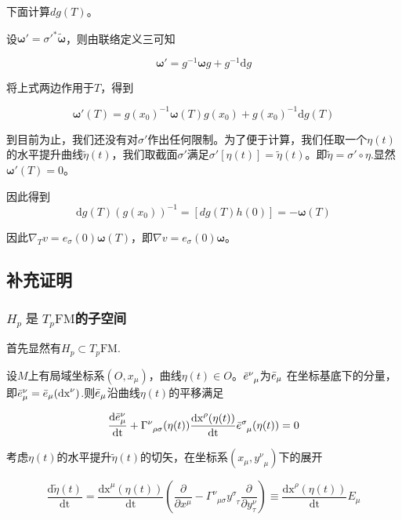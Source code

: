 \documentclass{ctexbook}
\begin{document}
下面计算$dg(T)$。

设$\bm{\omega}'=\sigma'^{*}\tilde{\bm{\omega}}$，则由联络定义三可知

\begin{equation}
    \bm{\omega}'=g^{-1}\bm{\omega}g+g^{-1}\mathrm{d}g
\end{equation}

将上式两边作用于$T$，得到

\begin{equation}
    \bm{\omega}'(T)=g(x_0)^{-1}\bm{\omega}(T)g(x_0)+g(x_0)^{-1}\mathrm{d}g(T)
\end{equation}

到目前为止，我们还没有对$\sigma'$作出任何限制。为了便于计算，我们任取一个$\eta(t)$的水平提升曲线$\tilde{\eta}(t)$，我们取截面$\sigma'$满足$\sigma'[\eta(t)]=\tilde{\eta}(t)$。即$\tilde{\eta}=\sigma'\circ\eta$.显然$\bm{\omega}'(T)=0$。

因此得到
\begin{equation}
    \mathrm{d}g(T)(g(x_0))^{-1}=[dg(T)h(0)]=-\bm{\omega}(T)
\end{equation}

因此$\nabla_T v=e_\sigma(0)\bm{\omega}(T)$，即$\nabla v=e_\sigma(0)\bm{\omega}$。

\subsection{补充证明}

\subsubsection{$H_p\;\text{是}\;T_p\mathrm{FM}$的子空间}

首先显然有$H_p\subset T_p\mathrm{FM}$.

设$M$上有局域坐标系$(O,x_\mu)$，曲线$\eta(t)\in O$。$\Bar{e}^{\nu}_{\;\;\mu}$为$\Bar{e}_\mu$ 在坐标基底下的分量，即$\Bar{e}^{\nu}_{\mu}=\Bar{e}_\mu(\mathrm{dx}^\nu)$.则$\Bar{e}_\mu$沿曲线$\eta(t)$的平移满足

\begin{equation}
    \frac{\mathrm{d}\Bar{e}^{\nu}_{\mu}}{\mathrm{dt}}+\Gamma^{\nu}_{\;\;\rho\sigma}(\eta(t))\frac{\mathrm{dx}^{\rho}(\eta(t))}{\mathrm{dt}}\Bar{e}^{\sigma}_{\;\;\mu}(\eta(t))=0
\end{equation}

考虑$\eta(t)$的水平提升$\tilde{\eta}(t)$的切矢，在坐标系$(x_\mu,y^{\nu}_{\;\;\mu})$下的展开

\begin{equation}
    \frac{\mathrm{d}\tilde{\eta}(t)}{\mathrm{dt}}=\frac{\mathrm{dx}^{\mu}(\eta(t))}{\mathrm{dt}}\left(\frac{\partial}{\partial x^\mu}-\Gamma^{\nu}_{\;\;\mu\sigma}y^{\sigma}_{\;\;\tau}\frac{\partial}{\partial y^{\nu}_{\tau}}\right)\equiv\frac{\mathrm{dx}^{\rho}(\eta(t))}{\mathrm{dt}} E_\mu
\end{equation}
\end{document}

